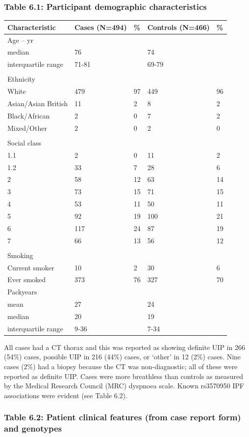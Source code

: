 \newpage

\hypertarget{table-6.1-participant-demographic-characteristics}{%
\subsubsection{Table 6.1: Participant demographic
characteristics}\label{table-6.1-participant-demographic-characteristics}}

\begin{longtable}[]{@{}lllll@{}}
\toprule
Characteristic & Cases (N=494) & \% & Controls (N=466) &
\%\tabularnewline
\midrule
\endhead
Age -- yr & & & &\tabularnewline
median & 76 & & 74 &\tabularnewline
interquartile range & 71-81 & & 69-79 &\tabularnewline
& & & &\tabularnewline
Ethnicity & & & &\tabularnewline
White & 479 & 97 & 449 & 96\tabularnewline
Asian/Asian British & 11 & 2 & 8 & 2\tabularnewline
Black/African & 2 & 0 & 7 & 2\tabularnewline
Mixed/Other & 2 & 0 & 2 & 0\tabularnewline
& & & &\tabularnewline
Social class & & & &\tabularnewline
1.1 & 2 & 0 & 11 & 2\tabularnewline
1.2 & 33 & 7 & 28 & 6\tabularnewline
2 & 58 & 12 & 63 & 14\tabularnewline
3 & 73 & 15 & 71 & 15\tabularnewline
4 & 53 & 11 & 50 & 11\tabularnewline
5 & 92 & 19 & 100 & 21\tabularnewline
6 & 117 & 24 & 87 & 19\tabularnewline
7 & 66 & 13 & 56 & 12\tabularnewline
& & & &\tabularnewline
Smoking & & & &\tabularnewline
Current smoker & 10 & 2 & 30 & 6\tabularnewline
Ever smoked & 373 & 76 & 327 & 70\tabularnewline
Packyears & & & &\tabularnewline
mean & 27 & & 24 &\tabularnewline
median & 20 & & 19 &\tabularnewline
interquartile range & 9-36 & & 7-34 &\tabularnewline
\bottomrule
\end{longtable}

All cases had a CT thorax and this was reported as showing definite UIP
in 266 (54\%) cases, possible UIP in 216 (44\%) cases, or `other' in 12
(2\%) cases. Nine cases (2\%) had a biopsy because the CT was
non-diagnostic; all of these were reported as definite UIP. Cases were
more breathless than controls as measured by the Medical Research
Council (MRC) dyspnoea scale. Known rs3570950 IPF associations were
evident (see Table 6.2).

\hypertarget{table-6.2-patient-clinical-features-from-case-report-form-and-genotypes}{%
\subsubsection{Table 6.2: Patient clinical features (from case report
form) and
genotypes}\label{table-6.2-patient-clinical-features-from-case-report-form-and-genotypes}}

